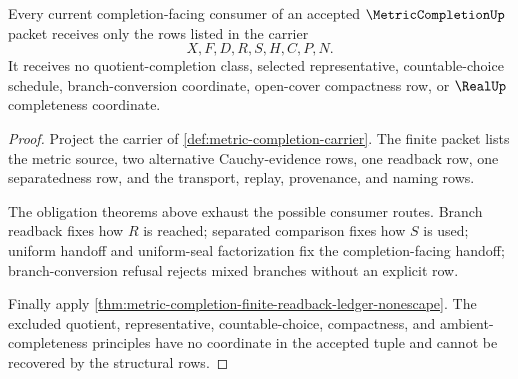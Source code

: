 \begin{theorem}
\label{thm:metric-completion-completion-consumer-totality}
Every current completion-facing consumer of an accepted $\MetricCompletionUp$ packet receives only the rows listed in the carrier
$$
X,F,D,R,S,H,C,P,N .
$$
It receives no quotient-completion class, selected representative, countable-choice schedule, branch-conversion coordinate, open-cover compactness row, or $\RealUp$ completeness coordinate.
\end{theorem}
\begin{proof}
Project the carrier of \autoref{def:metric-completion-carrier}. The finite packet lists the metric source, two alternative Cauchy-evidence rows, one readback row, one separatedness row, and the transport, replay, provenance, and naming rows.

The obligation theorems above exhaust the possible consumer routes. Branch readback fixes how $R$ is reached; separated comparison fixes how $S$ is used; uniform handoff and uniform-seal factorization fix the completion-facing handoff; branch-conversion refusal rejects mixed branches without an explicit row.

Finally apply \autoref{thm:metric-completion-finite-readback-ledger-nonescape}. The excluded quotient, representative, countable-choice, compactness, and ambient-completeness principles have no coordinate in the accepted tuple and cannot be recovered by the structural rows.
\end{proof}

